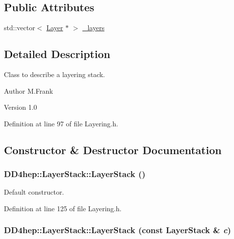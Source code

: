 \subsection*{Public Attributes}
\begin{DoxyCompactItemize}
\item 
std::vector$<$ \hyperlink{class_d_d4hep_1_1_layer}{Layer} $\ast$ $>$ \hyperlink{class_d_d4hep_1_1_layer_stack_a0e07d58da724e44b4d1c77120fb448d0}{\_\-layers}
\end{DoxyCompactItemize}


\subsection{Detailed Description}
Class to describe a layering stack. \begin{DoxyAuthor}{Author}
M.Frank 
\end{DoxyAuthor}
\begin{DoxyVersion}{Version}
1.0 
\end{DoxyVersion}


Definition at line 97 of file Layering.h.

\subsection{Constructor \& Destructor Documentation}
\hypertarget{class_d_d4hep_1_1_layer_stack_a802229c0f548c9e506b8fa6544d54563}{
\subsubsection[{LayerStack}]{\setlength{\rightskip}{0pt plus 5cm}DD4hep::LayerStack::LayerStack ()}}
\label{class_d_d4hep_1_1_layer_stack_a802229c0f548c9e506b8fa6544d54563}


Default constructor. 

Definition at line 125 of file Layering.h.\hypertarget{class_d_d4hep_1_1_layer_stack_a1eb37df2698ed881e8b3fe10fc418135}{
\subsubsection[{LayerStack}]{\setlength{\rightskip}{0pt plus 5cm}DD4hep::LayerStack::LayerStack (const {\bf LayerStack} \& {\em c})}}
\label{class_d_d4hep_1_1_layer_stack_a1eb37df2698ed881e8b3fe10fc418135}


